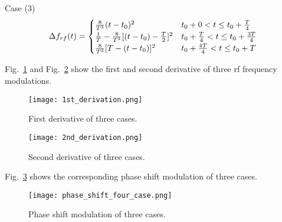 Case (3) 
\begin{eqnarray}\Delta f_{rf}(t)= 
\begin{cases}
\frac{8}{T^3}(t-t_0)^2&t_0+0<t\le t_0+\frac{T}{4}\cr  
\frac{1}{T}-\frac{8}{T^3}[(t-t_0)-\frac{T}{2}]^2	&t_0+\frac{T}{4}<t\le t_0+\frac{3T}{4}\cr 
\frac{8}{T^3}[T-(t-t_0)]^2	&t_0+\frac{4T}{4}<t\le t_0+T\cr  

\end{cases}
\end{eqnarray}


Fig.~\ref{1st_derivation} and Fig.~\ref{2nd_derivation} show the first and second derivative of three rf frequency modulations.
\begin{figure}[H]
   \centering   
   \texttt{[image: 1st\_derivation.png]}
   \caption{First derivative of three cases.}
   \label{1st_derivation}
\end{figure}
\begin{figure}[H]
   \centering   
   \texttt{[image: 2nd\_derivation.png]}
   \caption{Second derivative of three cases.}
   \label{2nd_derivation}
\end{figure}

Fig.~\ref{phase_shift_four_case} shows the corresponding phase shift modulation of three cases. 
\begin{figure}[H]
   \centering   
   \texttt{[image: phase\_shift\_four\_case.png]}
   \caption{Phase shift modulation of three cases.}
   \label{phase_shift_four_case}
\end{figure}

